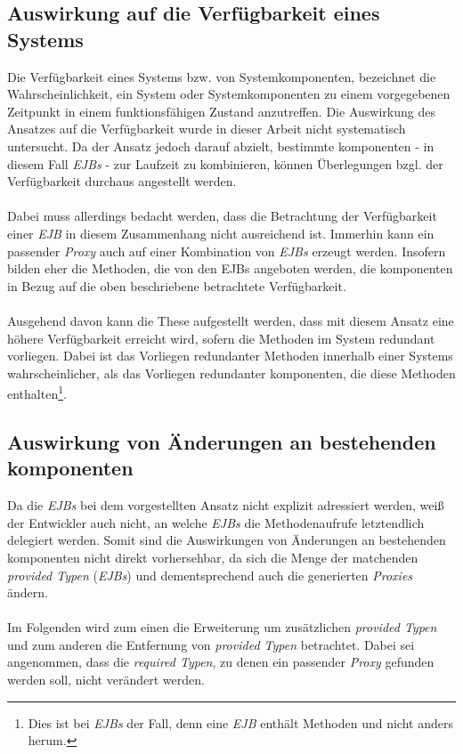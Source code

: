 \subsection{Auswirkung auf die Verfügbarkeit eines Systems}\label{sec_stabliliy}
Die Verfügbarkeit eines Systems bzw. von Systemkomponenten, bezeichnet die Wahrscheinlichkeit, ein System oder Systemkomponenten zu einem vorgegebenen Zeitpunkt in einem funktionsfähigen Zustand anzutreffen. \cite{it-admin}
Die Auswirkung des Ansatzes auf die Verfügbarkeit wurde in dieser Arbeit nicht systematisch untersucht. Da der Ansatz jedoch darauf abzielt, bestimmte \Gls{komponente}n - in diesem Fall \emph{EJBs} - zur Laufzeit zu kombinieren, können Überlegungen bzgl. der Verfügbarkeit durchaus angestellt werden.
\\\\
Dabei muss allerdings bedacht werden, dass die Betrachtung der Verfügbarkeit einer \emph{EJB} in diesem Zusammenhang nicht ausreichend ist. Immerhin kann ein passender \emph{Proxy} auch auf einer Kombination von \emph{EJBs} erzeugt werden. Insofern bilden eher die Methoden, die von den EJBs angeboten werden, die \Gls{komponente}n in Bezug auf die oben beschriebene betrachtete Verfügbarkeit.
\\\\
Ausgehend davon kann die These aufgestellt werden, dass mit diesem Ansatz eine höhere Verfügbarkeit erreicht wird, sofern die Methoden im System redundant vorliegen. Dabei ist das Vorliegen redundanter Methoden innerhalb einer Systems wahrscheinlicher, als das Vorliegen redundanter \Gls{komponente}n, die diese Methoden enthalten\footnote{Dies ist bei \emph{EJBs} der Fall, denn eine \emph{EJB} enthält Methoden und nicht anders herum.}. 

\subsection{Auswirkung von Änderungen an bestehenden \Gls{komponente}n}
Da die \emph{EJBs} bei dem vorgestellten Ansatz nicht explizit adressiert werden, weiß der Entwickler auch nicht, an welche \emph{EJBs} die Methodenaufrufe letztendlich delegiert werden. Somit sind die Auswirkungen von Änderungen an bestehenden \Gls{komponente}n nicht direkt vorhersehbar, da sich die Menge der matchenden \emph{provided Typen} (\emph{EJBs}) und dementsprechend auch die generierten \emph{Proxies} ändern.
\\\\
Im Folgenden wird zum einen die Erweiterung um zusätzlichen \emph{provided Typen} und zum anderen die Entfernung von \emph{provided Typen} betrachtet. Dabei sei angenommen, dass die \emph{required Typen}, zu denen ein passender \emph{Proxy} gefunden werden soll, nicht verändert werden.
